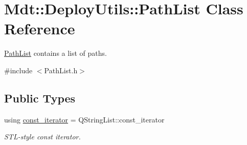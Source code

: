 \hypertarget{class_mdt_1_1_deploy_utils_1_1_path_list}{}\section{Mdt\+:\+:Deploy\+Utils\+:\+:Path\+List Class Reference}
\label{class_mdt_1_1_deploy_utils_1_1_path_list}


\hyperlink{class_mdt_1_1_deploy_utils_1_1_path_list}{Path\+List} contains a list of paths.  




{\ttfamily \#include $<$Path\+List.\+h$>$}

\subsection*{Public Types}
\begin{DoxyCompactItemize}
\item 
using \hyperlink{class_mdt_1_1_deploy_utils_1_1_path_list_a2666c4c9348c4f7a28014d4de9599717}{const\+\_\+iterator} = Q\+String\+List\+::const\+\_\+iterator\hypertarget{class_mdt_1_1_deploy_utils_1_1_path_list_a2666c4c9348c4f7a28014d4de9599717}{}\label{class_mdt_1_1_deploy_utils_1_1_path_list_a2666c4c9348c4f7a28014d4de9599717}

\begin{DoxyCompactList}\small\item\em S\+T\+L-\/style const iterator. \end{DoxyCompactList}\end{DoxyCompactItemize}
